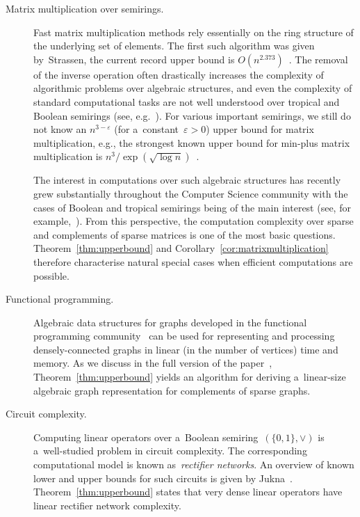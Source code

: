 \documentclass[review,onefignum,onetabnum]{siamart190516}
\begin{document}
\begin{description}
\item[Matrix multiplication over semirings.] Fast matrix
multiplication methods rely essentially on the ring structure of the underlying
set of elements. The first such algorithm was given by~Strassen,
the current record upper bound is $O(n^{2.373})$~\cite{DBLP:conf/stoc/Williams12, DBLP:conf/issac/Gall14a}.
The removal of the inverse operation often drastically increases the complexity
of algorithmic problems over algebraic structures, and even the complexity of
standard computational tasks are not well understood over tropical and
Boolean semirings (see, e.g.~\cite{Williams14,GrigorievP15}).
For various important semirings,
we still do not know an $n^{3-\varepsilon}$ (for a~constant~$\varepsilon>0$) upper
bound for matrix multiplication, e.g., the strongest known upper bound for
min-plus matrix multiplication is $n^3/\exp(\sqrt{\log n})$~\cite{Williams14}.

The interest in computations over such algebraic structures has
recently grew substantially throughout the
Computer Science community with the cases of Boolean and
tropical semirings being of the main interest (see, for
example,~\cite{Jukna16,Williams14,butkovic10systems}).
From this perspective, the computation complexity over sparse and complements of
sparse matrices is one of the most basic questions.
Theorem~\ref{thm:upperbound} and Corollary~\ref{cor:matrixmultiplication}
therefore characterise natural special
cases when efficient computations are possible.

\item[Functional programming.]
Algebraic data structures for graphs developed in the functional programming
community~\cite{mokhov2017algebraic} can be used for representing and processing
densely-connected graphs in linear (in the number of vertices) time and memory.
As we discuss in
the full version of the paper~\cite{DBLP:journals/eccc/KulikovMMP19},
Theorem~\ref{thm:upperbound}
yields an algorithm for deriving a~linear-size algebraic graph representation
for complements of sparse graphs.

\item[Circuit complexity.] Computing linear operators over
a~Boolean semiring~$(\{0,1\}, \lor)$ is a~well-studied problem
in circuit complexity. The corresponding computational model is known
as~\emph{rectifier networks}. An overview of known lower and upper bounds for
such circuits is given by Jukna~\cite[Section~13.6]{DBLP:books/daglib/0028687}.
Theorem~\ref{thm:upperbound} states that very dense linear operators have
linear rectifier network complexity.
\end{description}
\end{document}
